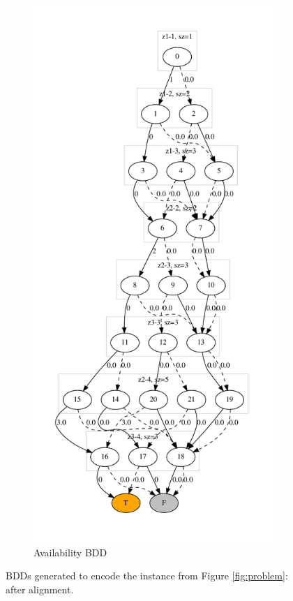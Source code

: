 \documentclass[11pt]{article}
\begin{document}
\begin{figure}[t!]
\begin{subfigure}[t]{0.45\textwidth}
  \end{subfigure}%
  \hfill
  \begin{subfigure}[t]{0.45\textwidth}
    \includegraphics[height=\textheight]{./A_aligned.dot.pdf}
    \caption{Availability BDD}\label{fig:availA}
  \end{subfigure}
  \caption{BDDs generated to encode the instance from Figure \ref{fig:problem}: after alignment.}
\end{figure}
\end{document}
